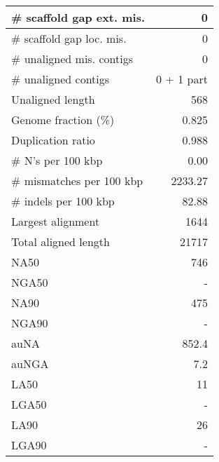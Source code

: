 \documentclass[12pt,a4paper]{article}
\begin{document}
\begin{table}[ht]
\begin{center}
\begin{tabular}{|l*{1}{|r}|}
\# scaffold gap ext. mis. & 0 \\ \hline
\# scaffold gap loc. mis. & 0 \\ \hline
\# unaligned mis. contigs & 0 \\ \hline
\# unaligned contigs & 0 + 1 part \\ \hline
Unaligned length & 568 \\ \hline
Genome fraction (\%) & 0.825 \\ \hline
Duplication ratio & 0.988 \\ \hline
\# N's per 100 kbp & 0.00 \\ \hline
\# mismatches per 100 kbp & 2233.27 \\ \hline
\# indels per 100 kbp & 82.88 \\ \hline
Largest alignment & 1644 \\ \hline
Total aligned length & 21717 \\ \hline
NA50 & 746 \\ \hline
NGA50 & - \\ \hline
NA90 & 475 \\ \hline
NGA90 & - \\ \hline
auNA & 852.4 \\ \hline
auNGA & 7.2 \\ \hline
LA50 & 11 \\ \hline
LGA50 & - \\ \hline
LA90 & 26 \\ \hline
LGA90 & - \\ \hline
\end{tabular}
\end{center}
\end{table}
\end{document}
